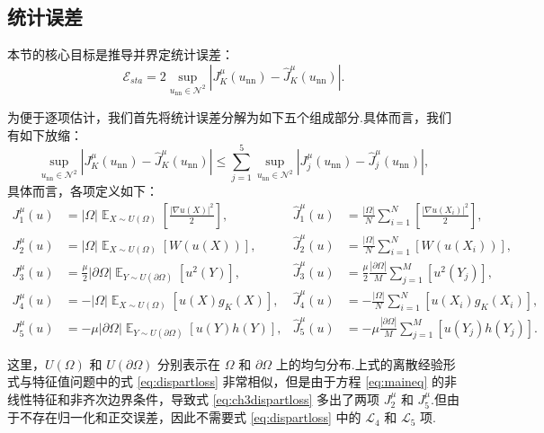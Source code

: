 \subsection{统计误差}\label{sec:staerr}
本节的核心目标是推导并界定统计误差：
\begin{equation*}
\mathcal{E}_{sta}=2\sup_{u_{\text{nn}}\in\mathcal{N}^{2}}\left| J^{\mu}_{K}(u_{\text{nn}})-\widehat{J}^{\mu}_{K}(u_{\text{nn}}) \right|.
\end{equation*}

为便于逐项估计，我们首先将统计误差分解为如下五个组成部分.具体而言，我们有如下放缩：
\begin{equation}\label{lemma:staerr:ch3dec}
\sup _{u_{\text{nn}} \in \mathcal{N}^2}\left|J^{\mu}_{K}(u_{\text{nn}})-\widehat{J}^{\mu}_{K}(u_{\text{nn}})\right|\leq\sum_{j=1}^{5}\sup _{u_{\text{nn}} \in \mathcal{N}^2}\left|J_{j}^{\mu}(u_{\text{nn}})-\widehat{J}_{j}^{\mu}(u_{\text{nn}})\right|,
\end{equation}
具体而言，各项定义如下：
\begin{equation}\label{eq:ch3dispartloss}
\begin{aligned} 
J_{1}^{\mu}(u)&=|\Omega|\mathop{\mathbb{E}}_{X\sim U(\Omega)}\left[\frac{|\nabla u(X)|^{2}}{2}\right], &\widehat{J}_{1}^{\mu}(u)&=\frac{|\Omega|}{N}\sum\limits_{i=1}^{N}\left[ \frac{|\nabla u(X_{i})|^{2}}{2}\right], \\ 
J_{2}^{\mu}(u)&=|\Omega|\mathop{\mathbb{E}}_{X\sim U(\Omega)}\left[W(u(X))\right], &\widehat{J}_{2}^{\mu}(u)&=\frac{|\Omega|}{N}\sum\limits_{i=1}^{N}\left[W(u(X_{i}))\right], \\
J_{3}^{\mu}(u)&=\frac{\mu}{2} |\partial \Omega|\mathop{\mathbb{E}}_{Y\sim U(\partial\Omega)}\left[ u^{2}(Y) \right], &\widehat{J}_{3}^{\mu}(u)&=\frac{\mu}{2} \frac{|\partial\Omega|}{M}\sum\limits_{j=1}^{M}\left[u^{2}(Y_{j}) \right],\\
J_{4}^{\mu}(u)&=-|\Omega|\mathop{\mathbb{E}}_{X\sim U(\Omega)}\left[u(X)g_{K}(X)\right], &\widehat{J}_{4}^{\mu}(u)&=-\frac{|\Omega|}{N}\sum\limits_{i=1}^{N}\left[u(X_{i})g_{K}(X_{i})\right], \\
J_{5}^{\mu}(u)&=-\mu |\partial \Omega|\mathop{\mathbb{E}}_{Y\sim U(\partial\Omega)}\left[ u(Y)h(Y) \right], &\widehat{J}_{5}^{\mu}(u)&=-\mu \frac{|\partial\Omega|}{M}\sum\limits_{j=1}^{M}\left[u(Y_{j})h(Y_{j}) \right]. 
\end{aligned} 
\end{equation}

这里，$U(\Omega)$ 和 $U(\partial\Omega)$ 分别表示在 $\Omega$ 和 $\partial\Omega$ 上的均匀分布.上式的离散经验形式与特征值问题中的式 \eqref{eq:dispartloss} 非常相似，但是由于方程 \eqref{eq:maineq} 的非线性特征和非齐次边界条件，导致式 \eqref{eq:ch3dispartloss} 多出了两项 $J_{2}^{\mu}$ 和 $J_{5}^{\mu}$.但由于不存在归一化和正交误差，因此不需要式 \eqref{eq:dispartloss} 中的 $\mathcal{L}_4$ 和 $\mathcal{L}_5$ 项.


